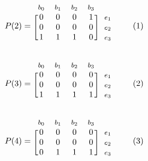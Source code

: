 \documentclass[12pt]{book}
\newcommand\addtag{\refstepcounter{equation}\tag{\theequation}}
\begin{document}
\begin{equation*}
  P(2)=
  \begin{blockarray}{*{4}{c} l}
    \begin{block}{*{4}{>{$\footnotesize}c<{$}} l}
      $b_0$ & $b_1$ & $b_2$ & $b_3$  \\
    \end{block}
    \begin{block}{[*{4}{c}]>{$\footnotesize}l<{$}}
       0 & 0 & 0 & 1 & $e_1$ \\
       0 & 0 & 0 & 0 & $e_2$ \\
       1 & 1 & 1 & 0 & $e_3$ \\
    \end{block}
  \end{blockarray} \addtag
\end{equation*}


\begin{equation*}
  P(3)=
  \begin{blockarray}{*{4}{c} l}
    \begin{block}{*{4}{>{$\footnotesize}c<{$}} l}
      $b_0$ & $b_1$ & $b_2$ & $b_3$ \\
    \end{block}
    \begin{block}{[*{4}{c}]>{$\footnotesize}l<{$}}
       0 & 0 & 0 & 0 & $e_1$ \\
       0 & 0 & 0 & 0 & $e_2$ \\
       1 & 1 & 1 & 1 & $e_3$ \\
    \end{block}
  \end{blockarray} \addtag
\end{equation*}

\begin{equation*}
  P(4)=
  \begin{blockarray}{*{4}{c} l}
    \begin{block}{*{4}{>{$\footnotesize}c<{$}} l}
     $b_0$ & $b_1$ & $b_2$ & $b_3$ \\
    \end{block}
    \begin{block}{[*{4}{c}]>{$\footnotesize}l<{$}}
       0 & 0 & 0 & 0 & $e_1$ \\
       0 & 0 & 0 & 0 & $e_2$ \\
       0 & 1 & 1 & 1 & $e_3$ \\
    \end{block}
  \end{blockarray} \addtag
\end{equation*}
\end{document}
